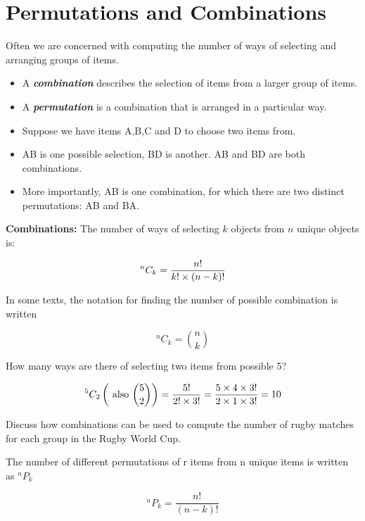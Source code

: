 \documentclass[12pt]{report}
\begin{document}
{\Large
\section{Permutations and Combinations}
	
	
	Often we are concerned with computing the number of ways of selecting and arranging groups of items. \begin{itemize} \item  A \textbf{\emph{combination}} describes the selection of items from a larger group of items.  \item A \textbf{\emph{permutation}} is a combination that is arranged in a particular way.
	\end{itemize}
	
	\bigskip
	\begin{itemize}
		\item Suppose we have items A,B,C and D to choose two items from.
		\item AB is one possible selection, BD is another. AB and BD are both combinations.
		\item More importantly, AB is one combination, for which there are two distinct permutations: AB and BA.
	\end{itemize}
}

{\Large
	
	\textbf{Combinations: }
	The number of ways of selecting $k$ objects from $n$ unique objects is:
	
	\[ ^n C_k = {n!  \over k! \times (n-k)!} \]
	
	In some texts, the notation for finding the number of possible combination is written
	
	\[ ^n C_k =  {n \choose k} \]
	
}

{\Large
	How many ways are there of selecting two items from possible 5?
	
	\[ ^5 C_2   \left( \mbox{ also }  {5 \choose 2}  \right) =  {5!  \over 2! \times 3!} =  {5 \times 4 \times 3!  \over 2 \times 1 \times 3!} = 10  \]
	
	\bigskip
	Discuss how combinations can be used to compute the number of rugby matches for each group in the Rugby World Cup.
	
}
{\Large
	The number of different permutations of r items from n unique items is written as $^n P_k$
	
	
	\[ ^n P_k = \frac{n!}{(n-k)!}\]
}
\end{document}
